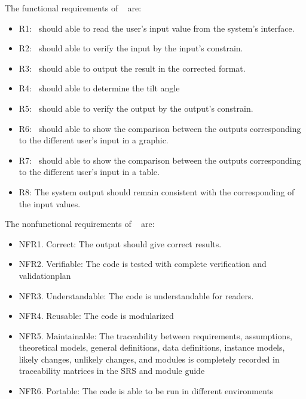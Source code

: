 \documentclass[12pt, titlepage]{article}
\begin{document}
The functional requirements of  \progname~ are:
\noindent \begin{itemize}

\item[ ]R1: \progname~should able to read the user's input value from the
system's interface.

\item[ ]R2: \progname~should able to verify the input by the input's constrain.

\item[ ]R3: \progname~should able to output the result in
the corrected format.

\item[ ]R4: \progname~should able to determine the tilt angle

\item[ ]R5: \progname~should able to verify the output by the output's constrain. 

\item[ ]R6: \progname~should able to show the comparison
between the outputs corresponding to the different user's input in a graphic.

\item[ ]R7: \progname~should able to show the comparison
between the outputs corresponding to the different user's input in a table.

\item[ ]R8: The system output should remain consistent with
the corresponding of the input values.

\end{itemize}

The nonfunctional requirements  of  \progname~ are: 
\begin{itemize} 
\item[ ]NFR1. Correct: The output should give correct results.
\item[ ]NFR2. Verifiable: The code is tested with complete verification and
validationplan
\item[ ]NFR3. Understandable: The code is understandable for readers. 
\item[ ]NFR4. Reusable: The code is modularized
\item[ ]NFR5. Maintainable: The traceability between requirements, assumptions,
theoretical models, general definitions, data definitions, instance models,
likely changes, unlikely changes, and modules is completely recorded in
traceability matrices in the SRS and module guide
\item[ ]NFR6. Portable: The code is able to be run in different environments 
\end{itemize}
\end{document}

